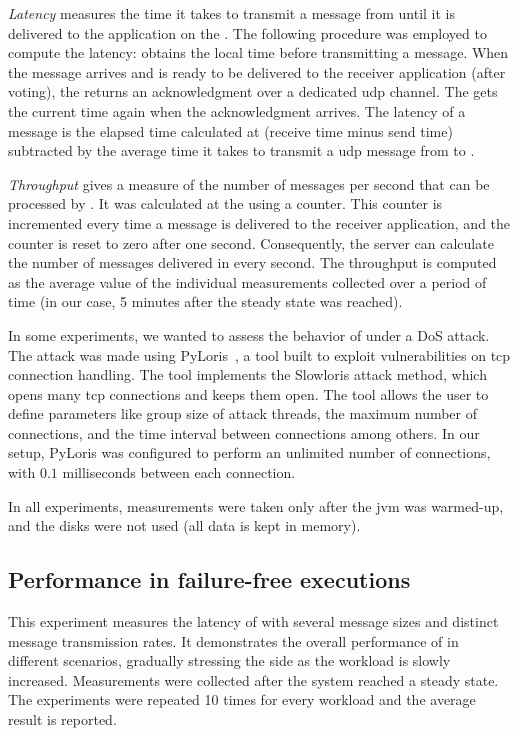 \emph{Latency} measures the time it takes to transmit a message from \sender until it is delivered to the application on the \postsieve. 
The following procedure was employed to compute the latency: \sender obtains the local time before transmitting a message. 
When the message arrives and is ready to be delivered to the receiver application (after voting), the \postsieve returns an acknowledgment over a dedicated \gls{udp} channel.
The \Sender gets the current time again when the acknowledgment arrives. 
The latency of a message is the elapsed time calculated at \sender (receive time minus send time) subtracted by the average time it takes to transmit a \gls{udp} message from \postsieve to \sender.

\emph{Throughput} gives a measure of the number of messages per second that can be processed by \sieveq. 
It was calculated at the \postsieve using a counter. 
This counter is incremented every time a message is delivered to the receiver application, and the counter is reset to zero after one second. 
Consequently, the server can calculate the number of messages delivered in every second. The throughput is computed as the average value of the individual measurements collected over a period of time (in our case, 5 minutes after the steady state was reached).

In some experiments, we wanted to assess the behavior of \sieveq under a DoS attack. 
The attack was made using PyLoris~\cite{pyloris}, a tool built to exploit vulnerabilities on \gls{tcp} connection handling.
The tool implements the Slowloris attack method, which opens many \gls{tcp} connections and keeps them open.
The tool allows the user to define parameters like group size of attack threads, the maximum number of connections, and the time interval between connections among others.
In our setup, PyLoris was configured to perform an unlimited number of connections, with $0.1$ milliseconds between each connection.

In all experiments, measurements were taken only after the \gls{jvm} was warmed-up, and the disks were not used (all data is kept in memory).


\subsection{Performance in failure-free executions}
\label{throughput_latency}

This experiment measures the latency of \sieveq with several message sizes and distinct message transmission rates. 
It demonstrates the overall performance of \sieveq in different scenarios, gradually stressing the \postsieve side as the workload is slowly increased. 
Measurements were collected after the system reached a steady state. 
The experiments were repeated 10 times for every workload and the average result is reported.

